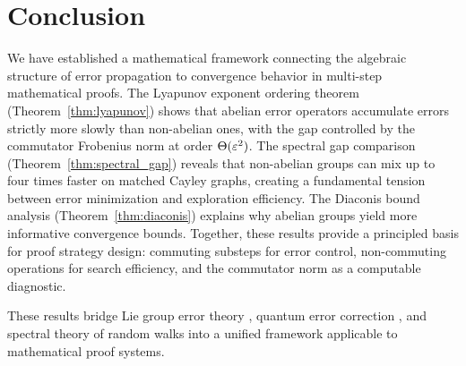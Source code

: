 \section{Conclusion}\label{sec:conclusion}

We have established a mathematical framework connecting the algebraic
structure of error propagation to convergence behavior in multi-step
mathematical proofs.  The Lyapunov exponent ordering theorem
(Theorem~\ref{thm:lyapunov}) shows that abelian error operators
accumulate errors strictly more slowly than non-abelian ones, with the
gap controlled by the commutator Frobenius norm at order $\Theta(\varepsilon^2)$.
The spectral gap comparison (Theorem~\ref{thm:spectral_gap}) reveals
that non-abelian groups can mix up to four times faster on matched Cayley
graphs, creating a fundamental tension between error minimization and
exploration efficiency.  The Diaconis bound analysis
(Theorem~\ref{thm:diaconis}) explains why abelian groups yield more
informative convergence bounds.  Together, these results provide a
principled basis for proof strategy design: commuting substeps for error
control, non-commuting operations for search efficiency, and the
commutator norm as a computable diagnostic.

These results bridge Lie group error theory \cite{barrau2014,wang2008,li2023},
quantum error correction \cite{gottesman1996,arvind2002,zhao2023},
and spectral theory of random walks \cite{diaconis1988,furstenberg1963}
into a unified framework applicable to mathematical proof systems.
